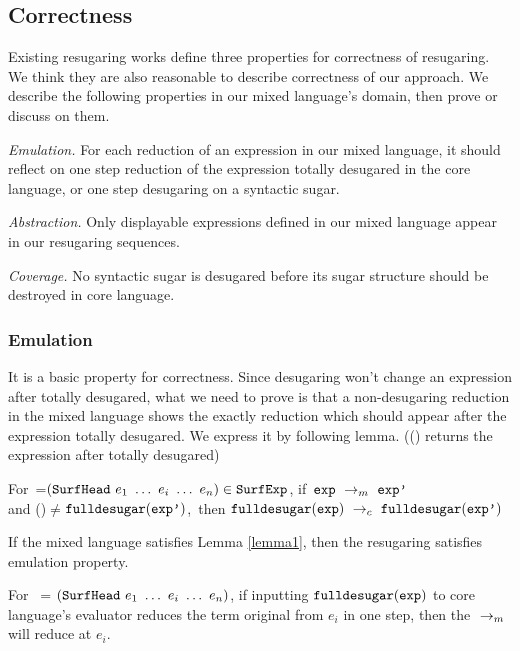 \subsection{Correctness}
\label{mark:correct}

Existing resugaring works\cite{resugaring,hygienic} define three properties for correctness of resugaring. We think they are also reasonable to describe correctness of our approach. We describe the following properties in our mixed language's domain, then prove or discuss on them.

\emph{Emulation.} For each reduction of an expression in our mixed language, it should reflect on one step reduction of the expression totally desugared in the core language, or one step desugaring on a syntactic sugar.

\emph{Abstraction.} Only displayable expressions defined in our mixed language appear in our resugaring sequences.

\emph{Coverage.} No syntactic sugar is desugared before its sugar structure should be destroyed in core language.

\subsubsection{Emulation} It is a basic property for correctness. Since desugaring won't change an expression after totally desugared, what we need to prove is that a non-desugaring reduction in the mixed language shows the exactly reduction which should appear after the expression totally desugared. We express it by following lemma. (() returns the expression after  totally desugared)

\begin{lemma}
\label{lemma1}

For~=$(\mbox{\tt SurfHead}~e_1~\ldots~e_i~\ldots~e_n)\in\mbox{\tt SurfExp}$, if~$\mbox{\tt exp} ~\rightarrow_m~\mbox{\tt exp'}$\\ and ()$\not=$$\mbox{\tt fulldesugar}(\mbox{\tt exp'})$,~then $\mbox{\tt fulldesugar}(\mbox{\tt exp}) ~\rightarrow_c~\mbox{\tt fulldesugar}(\mbox{\tt exp'})$

\end{lemma}

\begin{Def}[Emulation]
If the mixed language satisfies Lemma \ref{lemma1}, then the resugaring satisfies emulation property.
\end{Def}

\begin{lemma}
\label{lemma2}

For~ = $(\mbox{\tt SurfHead}~e_1~\ldots~e_i~\ldots~e_n)$, if inputting $\mbox{\tt fulldesugar}(\mbox{\tt exp})$ to core language's evaluator reduces the term original from $e_i$ in one step, then the $~\rightarrow_m~$ will reduce  at $e_i$.

\end{lemma}

